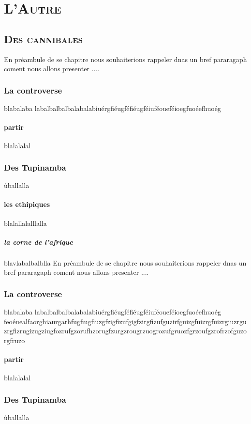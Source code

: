 \documentclass[12pt]{book}
\begin{document}
\tableofcontents%
\newpage
\mainmatter
\part{\textsc{L'Autre}}%
\chapter{\textsc{Des cannibales}}%
\parskip 25pt En préambule de se chapitre nous souhaiterions rappeler dnas un bref pararagaph coment nous allons presenter .... 
\section{La controverse}%
blabalaba
labalbalbalbalabalabiuérgfiéugféfiéugféiuféoueféioegfuoéefhuoég
\subsection{partir}%
blalalalal
\section{Des Tupinamba}%
ùballalla
\subsection{les ethipiques}%
blalallalalllalla
\subsubsection{la corne de l'afrique}%
blavlabalbalblla
\parskip 25pt En préambule de se chapitre nous souhaiterions rappeler dnas un bref pararagaph coment nous allons presenter .... 
\section{La controverse}%
blabalaba
labalbalbalbalabalabiuérgfiéugféfiéugféiuféoueféioegfuoéefhuoég
feoéuealfaorghiaurgarhfugfiugfiuzgfzigfizufgigfzirgfizufguzirfguizgfuizrgfuizrgiuzrguzrgfizrugizugziugfozrufgzorufhzorugfzurgzrougrzuogrozufgruozfgrzoufgzrofrzofguzorgfruzo
\subsection{partir}%
blalalalal
\section{Des Tupinamba}%
ùballalla
\end{document}
